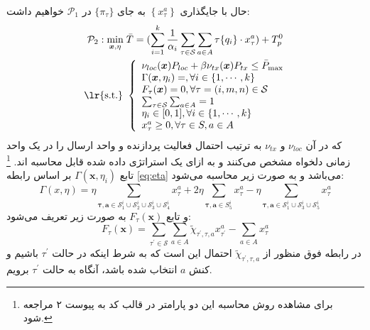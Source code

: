 حال با جایگذاری $\left\{x_{\tau}^{a}\right\}$ به جای $\{\pi_\tau\}$ در
$\mathcal{P}_{1}$
خواهیم داشت:
\begin{equation}
	\begin{aligned}
		\mathcal{P}_{2}: \min _{\boldsymbol{x}, \eta}\; & \bar{T}=(\sum_{i=1}^{k} \frac{1}{\alpha_i} \sum_{\tau \in \mathcal{S}} \sum_{a \in A} \tau\{q_i\} \cdot x_{\tau}^{a})+ T_p^0 \\
		\text { \lr{s.t.} } &\left\{\begin{array}{l}
			\nu_{l o c}(\boldsymbol{x}) P_{l o c}+\beta \nu_{t x}(\boldsymbol{x}) P_{t x} \leq \bar{P}_{\max } \\
			\Gamma(\boldsymbol{x}, \eta_i)=, \forall i \in \{1, \cdots, k\}\\
			F_{\tau}(\boldsymbol{x})=0, \forall \tau=(i, m, n) \in \mathcal{S} \\
			\sum_{\tau \in \mathcal{S}} \sum_{a \in A}=1 \\
			\eta_i \in [0, 1], \forall i \in \{1, \cdots, k\} \\
			x_{\tau}^{a} \geq 0, \forall \tau \in S, a \in A
		\end{array}\right.
	\end{aligned}
\end{equation}
که در آن
$\nu_{l o c}$
و
$\nu_{t x}$
به ترتیب احتمال فعالیت پردازنده و واحد ارسال را در یک واحد زمانی دلخواه مشخص می‌کنند و به ازای یک استراتژی داده شده قابل محاسبه اند. \footnote{برای مشاهده روش محاسبه این دو پارامتر در قالب کد به پیوست ۲ مراجعه شود.} تابع
$\Gamma(\boldsymbol{x}, \eta_i)$
بر اساس رابطه \ref{eq:eta} می‌باشد و به صورت زیر محاسبه می‌شود:
\begin{equation}
	\Gamma(x, \eta) = \eta  \sum_{\boldsymbol{\tau, a} \in \mathcal{S}_{1}^i\cup\mathcal{S}_{2}^i\cup\mathcal{S}_{3}^i\cup\mathcal{S}_{4}^i} x_{\tau}^a + 2 \eta \sum_{\boldsymbol{\tau, a} \in S_5^i} x_{\tau}^a
	- \eta \sum_{\boldsymbol{\tau, a} \in \mathcal{S}_{1}^i\cup\mathcal{S}_{3}^i\cup\mathcal{S}_{5}^i} x_{\tau}^a
\end{equation}
و تابع 
$F_{\tau}(\boldsymbol{x})$
به صورت زیر تعریف می‌شود:
\begin{equation}
	F_{\tau}(\boldsymbol{x})=\sum_{\tau^{\prime} \in \mathcal{S}} \sum_{a \in A} \tilde{\chi}_{\tau^{\prime}, \tau, a} x_{\tau^{\prime}}^{a}-\sum_{a \in A} x_{\tau}^{a}
\end{equation}
در رابطه فوق منظور از
$ \tilde{\chi}_{\tau^{\prime}, \tau, a}$
احتمال این است که به شرط اینکه در حالت
$\tau^{\prime}$
باشیم و کنش
$a$
انتخاب شده باشد، آنگاه به حالت
$\tau^{\prime}$
برویم. \\

